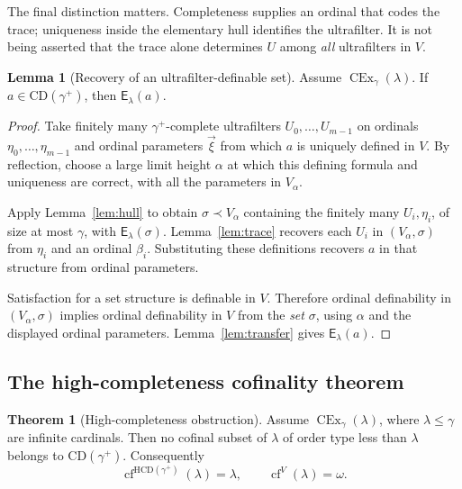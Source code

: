 \documentclass[11pt,letterpaper]{article}
\theoremstyle{definition}
\newtheorem{theorem}[definition]{Theorem}
\newtheorem{lemma}[definition]{Lemma}
\newcommand{\CEx}{\operatorname{CEx}}
\newcommand{\cf}{\operatorname{cf}}
\newcommand{\CD}{\mathrm{CD}}
\newcommand{\HCD}{\mathrm{HCD}}
\newcommand{\Erel}{\mathsf{E}}
\begin{document}
The final distinction matters. Completeness supplies an ordinal that codes the trace; uniqueness inside the elementary hull identifies the ultrafilter. It is not being asserted that the trace alone determines $U$ among \emph{all} ultrafilters in $V$.

\begin{lemma}[Recovery of an ultrafilter-definable set]\label{lem:recover}
Assume $\CEx_\gamma(\lambda)$. If $a\in\CD(\gamma^+)$, then $\Erel_\lambda(a)$.
\end{lemma}

\begin{proof}
Take finitely many $\gamma^+$-complete ultrafilters $U_0,\ldots,U_{m-1}$ on ordinals $\eta_0,\ldots,\eta_{m-1}$ and ordinal parameters $\vec\xi$ from which $a$ is uniquely defined in $V$. By reflection, choose a large limit height $\alpha$ at which this defining formula and uniqueness are correct, with all the parameters in $V_\alpha$.

Apply Lemma~\ref{lem:hull} to obtain $\sigma\prec V_\alpha$ containing the finitely many $U_i,\eta_i$, of size at most $\gamma$, with $\Erel_\lambda(\sigma)$. Lemma~\ref{lem:trace} recovers each $U_i$ in $(V_\alpha,\sigma)$ from $\eta_i$ and an ordinal $\beta_i$. Substituting these definitions recovers $a$ in that structure from ordinal parameters.

Satisfaction for a set structure is definable in $V$. Therefore ordinal definability in $(V_\alpha,\sigma)$ implies ordinal definability in $V$ from the \emph{set} $\sigma$, using $\alpha$ and the displayed ordinal parameters. Lemma~\ref{lem:transfer} gives $\Erel_\lambda(a)$.
\end{proof}

\subsection{The high-completeness cofinality theorem}

\begin{theorem}[High-completeness obstruction]\label{thm:core}
Assume $\CEx_\gamma(\lambda)$, where $\lambda\leq\gamma$ are infinite cardinals. Then no cofinal subset of $\lambda$ of order type less than $\lambda$ belongs to $\CD(\gamma^+)$. Consequently
\begin{equation}\label{eq:core}
 \cf^{\HCD(\gamma^+)}(\lambda)=\lambda,
 \qquad \cf^V(\lambda)=\omega.
\end{equation}
\end{theorem}
\end{document}
